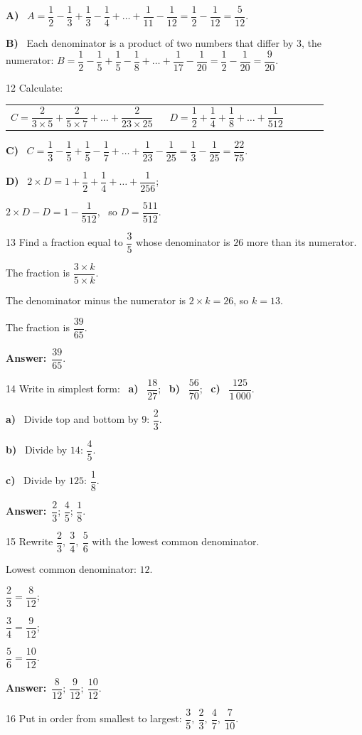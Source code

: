 \documentclass[11pt]{article}
\makeatletter
\newif\ifsol \solfalse
\renewcommand{\arraystretch}{1.35}
\providecommand{\AnsWord}{Đáp số}
\newcommand{\dapso}[1]{\par\textbf{\AnsWord:}\ #1}
\newcommand{\probsol}[1]{%
  \begin{lrbox}{\solmeasure}\begin{minipage}{\dimexpr\linewidth-24pt\relax}#1\end{minipage}\end{lrbox}%
  \ifsol
    \begin{solbox}#1\end{solbox}%
  \else
    \setlength{\solht}{\dimexpr\ht\solmeasure+\dp\solmeasure+0.85cm\relax}%
    \ifdim\solht<1.35cm\setlength{\solht}{1.35cm}\fi
    \begin{tcolorbox}[colback=white,colframe=Line,boxrule=0.8pt,arc=5pt,
      left=8pt,right=8pt,top=4pt,bottom=4pt,height=\solht]{\footnotesize\color{Slate}\itshape\WorkWord}\end{tcolorbox}%
  \fi}
\newcommand{\pa}[1]{\textbf{#1)}\ }
\newenvironment{cols2}{\par\vspace{3pt}\noindent\setlength{\tabcolsep}{0pt}\renewcommand{\arraystretch}{1.3}%
  \begin{tabular}{@{}>{\raggedright\arraybackslash\rule{0pt}{4.4ex}}p{0.48\linewidth}<{\rule[-2.3ex]{0pt}{0pt}}@{\hspace{0.03\linewidth}}>{\raggedright\arraybackslash\rule{0pt}{4.4ex}}p{0.48\linewidth}<{\rule[-2.3ex]{0pt}{0pt}}@{}}}%
  {\end{tabular}\par}
\newcommand{\gap}{\vspace{0.3cm}}
\def\WorkWord{Your work:}
\def\AnsWord{Answer}
\makeatother
\begin{document}
\probsol{
\pa{A} $A=\dfrac12-\dfrac13+\dfrac13-\dfrac14+\dots+\dfrac1{11}-\dfrac1{12}=\dfrac12-\dfrac1{12}=\dfrac5{12}$.\par
\pa{B} Each denominator is a product of two numbers that differ by $3$, the numerator: $B=\dfrac12-\dfrac15+\dfrac15-\dfrac18+\dots+\dfrac1{17}-\dfrac1{20}=\dfrac12-\dfrac1{20}=\dfrac9{20}$.
}
\gap
\begin{probbox}{12}{\relax}
Calculate:
\begin{cols2}
$C=\dfrac2{3\times5}+\dfrac2{5\times7}+\dots+\dfrac2{23\times25}$ & $D=\dfrac12+\dfrac14+\dfrac18+\dots+\dfrac1{512}$
\end{cols2}
\end{probbox}
\probsol{
\pa{C} $C=\dfrac13-\dfrac15+\dfrac15-\dfrac17+\dots+\dfrac1{23}-\dfrac1{25}=\dfrac13-\dfrac1{25}=\dfrac{22}{75}$.\par
\pa{D} $2\times D=1+\dfrac12+\dfrac14+\dots+\dfrac1{256}$;\par $2\times D-D=1-\dfrac1{512}$, \ so $D=\dfrac{511}{512}$.
}
\gap
\begin{probbox}{13}{\relax}
Find a fraction equal to $\dfrac35$ whose denominator is $26$ more than its numerator.
\end{probbox}
\probsol{
The fraction is $\dfrac{3\times k}{5\times k}$.\par The denominator minus the numerator is $2\times k=26$, so $k=13$.\par
The fraction is $\dfrac{39}{65}$.
\dapso{$\dfrac{39}{65}$.}}
\gap
\begin{probbox}{14}{\relax}
Write in simplest form: \ \pa{a} $\dfrac{18}{27}$; \ \pa{b} $\dfrac{56}{70}$; \ \pa{c} $\dfrac{125}{1\,000}$.
\end{probbox}
\probsol{
\pa{a} Divide top and bottom by $9$: $\dfrac23$.\par \pa{b} Divide by $14$: $\dfrac45$.\par \pa{c} Divide by $125$: $\dfrac18$.
\dapso{$\dfrac23$; $\dfrac45$; $\dfrac18$.}}
\gap
\begin{probbox}{15}{\relax}
Rewrite $\dfrac23,\ \dfrac34,\ \dfrac56$ with the lowest common denominator.
\end{probbox}
\probsol{
Lowest common denominator: $12$.\par $\dfrac23=\dfrac8{12}$;\par $\dfrac34=\dfrac9{12}$;\par $\dfrac56=\dfrac{10}{12}$.
\dapso{$\dfrac8{12};\ \dfrac9{12};\ \dfrac{10}{12}$.}}
\gap
\begin{probbox}{16}{\relax}
Put in order from smallest to largest: $\dfrac35,\ \dfrac23,\ \dfrac47,\ \dfrac7{10}$.
\end{probbox}
\end{document}
